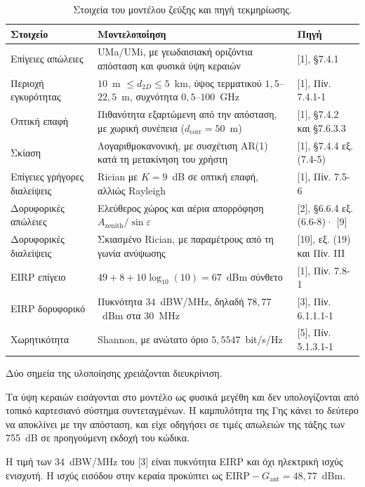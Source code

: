 \documentclass[11pt,a4paper]{article}
\begin{document}
\begin{table}[htbp]
\centering\small
\caption{Στοιχεία του μοντέλου ζεύξης και πηγή τεκμηρίωσης.}
\label{tab:model}
\begin{tabular}{@{}p{4.2cm}p{5.9cm}p{5.1cm}@{}}
\toprule
Στοιχείο & Μοντελοποίηση & Πηγή \\
\midrule
Επίγειες απώλειες & UMa/UMi, με γεωδαισιακή οριζόντια απόσταση και φυσικά ύψη
κεραιών & [1], §7.4.1 \\
Περιοχή εγκυρότητας & $10$~m $\le d_{2D} \le 5$~km, ύψος τερματικού
$1{,}5$–$22{,}5$~m, συχνότητα $0{,}5$–$100$~GHz & [1], Πίν. 7.4.1-1 \\
Οπτική επαφή & Πιθανότητα εξαρτώμενη από την απόσταση, με χωρική συνέπεια
($d_{\mathrm{corr}} = 50$~m) & [1], §7.4.2 και §7.6.3.3 \\
Σκίαση & Λογαριθμοκανονική, με συσχέτιση AR(1) κατά τη μετακίνηση του χρήστη &
[1], §7.4.4 εξ. (7.4-5) \\
Επίγειες γρήγορες διαλείψεις & Rician με $K = 9$~dB σε οπτική επαφή, αλλιώς
Rayleigh & [1], Πίν. 7.5-6 \\
Δορυφορικές απώλειες & Ελεύθερος χώρος και αέρια απορρόφηση
$A_{\mathrm{zenith}}/\sin\varepsilon$ & [2], §6.6.4 εξ. (6.6-8)· [9] \\
Δορυφορικές διαλείψεις & Σκιασμένο Rician, με παραμέτρους από τη γωνία ανύψωσης
& [10], εξ. (19) και Πίν. III \\
EIRP επίγειο & $49 + 8 + 10\log_{10}(10) = 67$~dBm σύνθετο & [1], Πίν. 7.8-1 \\
EIRP δορυφορικό & Πυκνότητα $34$~dBW/MHz, δηλαδή $78{,}77$~dBm στα $30$~MHz &
[3], Πίν. 6.1.1.1-1 \\
Χωρητικότητα & Shannon, με ανώτατο όριο $5{,}5547$~bit/s/Hz & [5],
Πίν. 5.1.3.1-1 \\
\bottomrule
\end{tabular}
\end{table}

Δύο σημεία της υλοποίησης χρειάζονται διευκρίνιση.

Τα ύψη κεραιών εισάγονται στο μοντέλο ως φυσικά μεγέθη και δεν υπολογίζονται
από τοπικό καρτεσιανό σύστημα συντεταγμένων. Η καμπυλότητα της Γης κάνει το
δεύτερο να αποκλίνει με την απόσταση, και είχε οδηγήσει σε τιμές απωλειών της
τάξης των 755~dB σε προηγούμενη εκδοχή του κώδικα.

Η τιμή των 34~dBW/MHz του [3] είναι πυκνότητα EIRP και όχι ηλεκτρική ισχύς
ενισχυτή. Η ισχύς εισόδου στην κεραία προκύπτει ως
$\mathrm{EIRP} - G_{\mathrm{ant}} = 48{,}77$~dBm.
\end{document}
